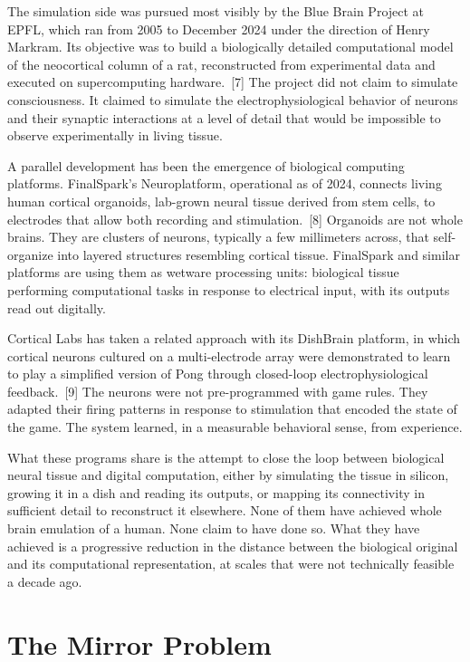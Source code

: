 \documentclass[11pt,a4paper]{article}
\begin{document}
The simulation side was pursued most visibly by the Blue Brain Project at EPFL, which ran from 2005 to December 2024 under the direction of Henry Markram. Its objective was to build a biologically detailed computational model of the neocortical column of a rat, reconstructed from experimental data and executed on supercomputing hardware.~[7] The project did not claim to simulate consciousness. It claimed to simulate the electrophysiological behavior of neurons and their synaptic interactions at a level of detail that would be impossible to observe experimentally in living tissue.

A parallel development has been the emergence of biological computing platforms. FinalSpark's Neuroplatform, operational as of 2024, connects living human cortical organoids, lab-grown neural tissue derived from stem cells, to electrodes that allow both recording and stimulation.~[8] Organoids are not whole brains. They are clusters of neurons, typically a few millimeters across, that self-organize into layered structures resembling cortical tissue. FinalSpark and similar platforms are using them as wetware processing units: biological tissue performing computational tasks in response to electrical input, with its outputs read out digitally.

Cortical Labs has taken a related approach with its DishBrain platform, in which cortical neurons cultured on a multi-electrode array were demonstrated to learn to play a simplified version of Pong through closed-loop electrophysiological feedback.~[9] The neurons were not pre-programmed with game rules. They adapted their firing patterns in response to stimulation that encoded the state of the game. The system learned, in a measurable behavioral sense, from experience.

What these programs share is the attempt to close the loop between biological neural tissue and digital computation, either by simulating the tissue in silicon, growing it in a dish and reading its outputs, or mapping its connectivity in sufficient detail to reconstruct it elsewhere. None of them have achieved whole brain emulation of a human. None claim to have done so. What they have achieved is a progressive reduction in the distance between the biological original and its computational representation, at scales that were not technically feasible a decade ago.

\section{The Mirror Problem}
\end{document}
